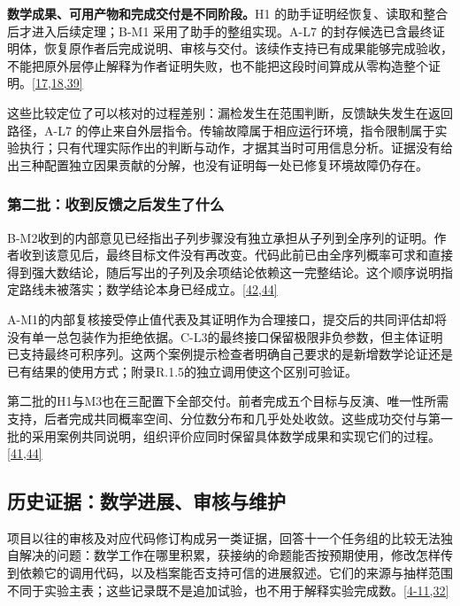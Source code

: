 \textbf{数学成果、可用产物和完成交付是不同阶段。}H1 的助手证明经恢复、读取和整合后才进入后续定理；B-M1 采用了助手的整组实现。A-L7 的封存候选已含最终证明体，恢复原作者后完成说明、审核与交付。该续作支持已有成果能够完成验收，不能把原外层停止解释为作者证明失败，也不能把这段时间算成从零构造整个证明。\href{zh.pdf\#ref-17}{\mbox{[17,18,39]}}

这些比较定位了可以核对的过程差别：漏检发生在范围判断，反馈缺失发生在返回路径，A-L7 的停止来自外层指令。传输故障属于相应运行环境，指令限制属于实验执行；只有代理实际作出的判断与动作，才据其当时可用信息分析。证据没有给出三种配置独立因果贡献的分解，也没有证明每一处已修复环境故障仍存在。

\subsubsection[第二批：收到反馈之后发生了什么]{\texorpdfstring{\protect\hypertarget{r2-8}{}第二批：收到反馈之后发生了什么}{第二批：收到反馈之后发生了什么}}
B-M2收到的内部意见已经指出子列步骤没有独立承担从子列到全序列的证明。作者收到该意见后，最终目标文件没有再改变。代码此前已由全序列概率可求和直接得到强大数结论，随后写出的子列及余项结论依赖这一完整结论。这个顺序说明指定路线未被落实；数学结论本身已经成立。\href{zh.pdf\#ref-42}{\mbox{[42,44]}}

A-M1的内部复核接受停止值代表及其证明作为合理接口，提交后的共同评估却将没有单一总包装作为拒绝依据。C-L3的最终接口保留极限非负参数，但主体证明已支持最终可积序列。这两个案例提示检查者明确自己要求的是新增数学论证还是已有结果的使用方式；附录R.1.5的独立调用使这个区别可验证。

第二批的H1与M3也在三配置下全部交付。前者完成五个目标与反演、唯一性所需支持，后者完成共同概率空间、分位数分布和几乎处处收敛。这些成功交付与第一批的采用案例共同说明，组织评价应同时保留具体数学成果和实现它们的过程。\href{zh.pdf\#ref-41}{\mbox{[41,44]}}

\subsection[历史证据：数学进展、审核与维护]{\texorpdfstring{\protect\hypertarget{r3}{}历史证据：数学进展、审核与维护}{历史证据：数学进展、审核与维护}}
项目以往的审核及对应代码修订构成另一类证据，回答十一个任务组的比较无法独自解决的问题：数学工作在哪里积累，获接纳的命题能否按预期使用，修改怎样传到依赖它的调用代码，以及档案能否支持可信的进展叙述。它们的来源与抽样范围不同于实验主表；这些记录既不是追加试验，也不用于解释实验完成数。\href{zh.pdf\#ref-4}{\mbox{[4-11,32]}}

